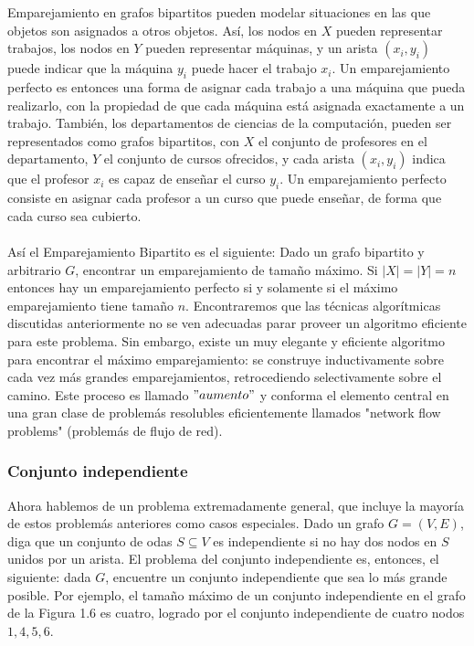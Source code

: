 \documentclass[a4paper]{article}
\begin{document}
Emparejamiento en grafos bipartitos pueden modelar situaciones en las que objetos son asignados a otros objetos. Así, los nodos en $X$ pueden representar trabajos, los nodos en $Y$ pueden representar máquinas, y un arista $(x_i,y_i)$ puede indicar que la máquina $y_i$ puede hacer el trabajo $x_i$. Un emparejamiento perfecto es entonces una forma de asignar cada trabajo a una máquina que pueda realizarlo, con la propiedad de que cada máquina está asignada exactamente a un trabajo. También, los departamentos de ciencias de la computación, pueden ser representados como grafos bipartitos, con $X$ el conjunto de profesores en el departamento, $Y$ el conjunto de cursos ofrecidos, y cada arista $(x_i, y_i)$ indica que el profesor $x_i$ es capaz de enseñar el curso $y_i$. Un emparejamiento perfecto consiste en asignar cada profesor a un curso que puede enseñar, de forma que cada curso sea cubierto.
\\\\
Así el Emparejamiento Bipartito es el siguiente: Dado un grafo bipartito y arbitrario $G$, encontrar un emparejamiento de tamaño máximo. Si $|X| = |Y| = n$ entonces hay un emparejamiento perfecto si y solamente si el máximo emparejamiento tiene tamaño $n$. Encontraremos que las técnicas algorítmicas discutidas anteriormente no se ven adecuadas parar proveer un algoritmo eficiente para este problema. Sin embargo, existe un muy elegante y eficiente algoritmo para encontrar el máximo emparejamiento: se construye inductivamente sobre cada vez más grandes emparejamientos, retrocediendo selectivamente sobre el camino. Este proceso es llamado $"aumento"$ y conforma el elemento central en una gran clase de problemás resolubles eficientemente llamados "network flow problems" (problemás de flujo de red).\\

\subsubsection*{Conjunto independiente}

Ahora hablemos de un problema extremadamente general, que incluye la mayoría de estos problemás anteriores como casos especiales. Dado un grafo $G=(V,E)$, diga que un conjunto de odas $S⊆V$ es independiente si no hay dos nodos en $S$ unidos por un arista. El problema del conjunto independiente es, entonces, el siguiente: dada $G$, encuentre un conjunto independiente que sea lo más grande posible. Por ejemplo, el tamaño máximo de un conjunto independiente en el grafo de la Figura 1.6 es cuatro, logrado por el conjunto independiente de cuatro nodos ${1,4,5,6}$.\\
\end{document}
